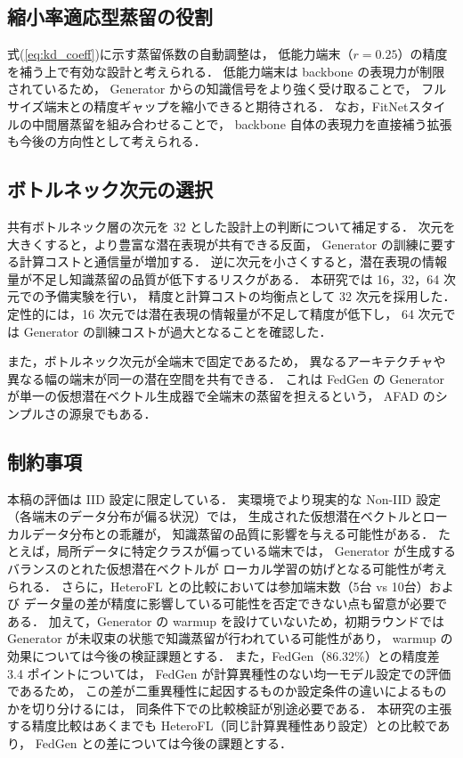 \documentclass[Japanese,noauthor]{dicomopapers}
\begin{document}
\subsection{縮小率適応型蒸留の役割}

式(\ref{eq:kd_coeff})に示す蒸留係数の自動調整は，
低能力端末（$r = 0.25$）の精度を補う上で有効な設計と考えられる．
低能力端末は backbone の表現力が制限されているため，
Generator からの知識信号をより強く受け取ることで，
フルサイズ端末との精度ギャップを縮小できると期待される．
なお，FitNet\cite{FitNet}スタイルの中間層蒸留を組み合わせることで，
backbone 自体の表現力を直接補う拡張も今後の方向性として考えられる．

\subsection{ボトルネック次元の選択}

共有ボトルネック層の次元を 32 とした設計上の判断について補足する．
次元を大きくすると，より豊富な潜在表現が共有できる反面，
Generator の訓練に要する計算コストと通信量が増加する．
逆に次元を小さくすると，潜在表現の情報量が不足し知識蒸留の品質が低下するリスクがある．
本研究では 16，32，64 次元での予備実験を行い，
精度と計算コストの均衡点として 32 次元を採用した．
定性的には，16 次元では潜在表現の情報量が不足して精度が低下し，
64 次元では Generator の訓練コストが過大となることを確認した．

また，ボトルネック次元が全端末で固定であるため，
異なるアーキテクチャや異なる幅の端末が同一の潜在空間を共有できる．
これは FedGen の Generator が単一の仮想潜在ベクトル生成器で全端末の蒸留を担えるという，
AFAD のシンプルさの源泉でもある．

\subsection{制約事項}

本稿の評価は IID 設定に限定している．
実環境でより現実的な Non-IID 設定（各端末のデータ分布が偏る状況）では，
生成された仮想潜在ベクトルとローカルデータ分布との乖離が，
知識蒸留の品質に影響を与える可能性がある．
たとえば，局所データに特定クラスが偏っている端末では，
Generator が生成するバランスのとれた仮想潜在ベクトルが
ローカル学習の妨げとなる可能性が考えられる．
さらに，HeteroFL との比較においては参加端末数（5台 vs 10台）および
データ量の差が精度に影響している可能性を否定できない点も留意が必要である．
加えて，Generator の warmup を設けていないため，初期ラウンドでは
Generator が未収束の状態で知識蒸留が行われている可能性があり，
warmup の効果については今後の検証課題とする．
また，FedGen（86.32\%）との精度差 3.4 ポイントについては，
FedGen が計算異種性のない均一モデル設定での評価であるため，
この差が二重異種性に起因するものか設定条件の違いによるものかを切り分けるには，
同条件下での比較検証が別途必要である．
本研究の主張する精度比較はあくまでも HeteroFL（同じ計算異種性あり設定）との比較であり，
FedGen との差については今後の課題とする．
\end{document}

